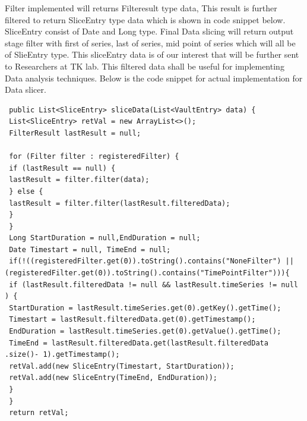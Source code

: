 \documentclass[article,type=msc,colorback,accentcolor=tud9c,twoside,11pt]{tudthesis}
\begin{document}
 Filter implemented will returns Filteresult type data, This result is further filtered to  return SliceEntry type data which is shown in code snippet below. SliceEntry consist of Date and Long type. Final Data slicing will return output stage filter with first of series, last of series, mid point of series which will all be of SlieEntry type. This sliceEntry data is of our interest that will be further sent to Researchers at TK lab. This filtered data shall be useful for implementing Data analysis techniques\cite{DatananlysisandTechniques}. Below is the code snippet for actual implementation for Data slicer.
 \begin{lstlisting}
 public List<SliceEntry> sliceData(List<VaultEntry> data) {
 List<SliceEntry> retVal = new ArrayList<>();
 FilterResult lastResult = null;
 
 for (Filter filter : registeredFilter) {
 if (lastResult == null) {
 lastResult = filter.filter(data);
 } else {
 lastResult = filter.filter(lastResult.filteredData);
 }
 }
 Long StartDuration = null,EndDuration = null;
 Date Timestart = null, TimeEnd = null; 
 if(!((registeredFilter.get(0)).toString().contains("NoneFilter") || (registeredFilter.get(0)).toString().contains("TimePointFilter"))){
 if (lastResult.filteredData != null && lastResult.timeSeries != null ) {
 StartDuration = lastResult.timeSeries.get(0).getKey().getTime();
 Timestart = lastResult.filteredData.get(0).getTimestamp();
 EndDuration = lastResult.timeSeries.get(0).getValue().getTime();
 TimeEnd = lastResult.filteredData.get(lastResult.filteredData .size()- 1).getTimestamp();
 retVal.add(new SliceEntry(Timestart, StartDuration));
 retVal.add(new SliceEntry(TimeEnd, EndDuration)); 
 }
 } 
 return retVal;
 \end{lstlisting}
 \clearpage
 
 
\end{document}
